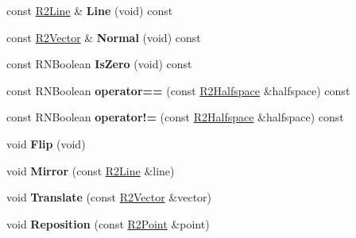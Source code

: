 \begin{DoxyCompactItemize}
\item 
const \hyperlink{class_r2_line}{R2\+Line} \& {\bfseries Line} (void) const \hypertarget{class_r2_halfspace_afb179b2e50370b18115d1543ec57b2bf}{}\label{class_r2_halfspace_afb179b2e50370b18115d1543ec57b2bf}

\item 
const \hyperlink{class_r2_vector}{R2\+Vector} \& {\bfseries Normal} (void) const \hypertarget{class_r2_halfspace_ae38798d3e5078be90579bfb0466f97c9}{}\label{class_r2_halfspace_ae38798d3e5078be90579bfb0466f97c9}

\item 
const R\+N\+Boolean {\bfseries Is\+Zero} (void) const \hypertarget{class_r2_halfspace_a4905ccec3f961bf98f42d3f0e12101fd}{}\label{class_r2_halfspace_a4905ccec3f961bf98f42d3f0e12101fd}

\item 
const R\+N\+Boolean {\bfseries operator==} (const \hyperlink{class_r2_halfspace}{R2\+Halfspace} \&halfspace) const \hypertarget{class_r2_halfspace_a6a352296e320b01a914008e909636fd2}{}\label{class_r2_halfspace_a6a352296e320b01a914008e909636fd2}

\item 
const R\+N\+Boolean {\bfseries operator!=} (const \hyperlink{class_r2_halfspace}{R2\+Halfspace} \&halfspace) const \hypertarget{class_r2_halfspace_a19fdf268cf925966a5d59c0e93250cc7}{}\label{class_r2_halfspace_a19fdf268cf925966a5d59c0e93250cc7}

\item 
void {\bfseries Flip} (void)\hypertarget{class_r2_halfspace_a785374d1e234f0e1d03abbe3796c683c}{}\label{class_r2_halfspace_a785374d1e234f0e1d03abbe3796c683c}

\item 
void {\bfseries Mirror} (const \hyperlink{class_r2_line}{R2\+Line} \&line)\hypertarget{class_r2_halfspace_a4447871e13f84ad639349cd8d906366b}{}\label{class_r2_halfspace_a4447871e13f84ad639349cd8d906366b}

\item 
void {\bfseries Translate} (const \hyperlink{class_r2_vector}{R2\+Vector} \&vector)\hypertarget{class_r2_halfspace_af3c6da9268f16dbfe6ee4ebbc1a255c8}{}\label{class_r2_halfspace_af3c6da9268f16dbfe6ee4ebbc1a255c8}

\item 
void {\bfseries Reposition} (const \hyperlink{class_r2_point}{R2\+Point} \&point)\hypertarget{class_r2_halfspace_a0c8e18c818bfa923c4f3ccca76deb8c2}{}\label{class_r2_halfspace_a0c8e18c818bfa923c4f3ccca76deb8c2}


\end{DoxyCompactItemize}
